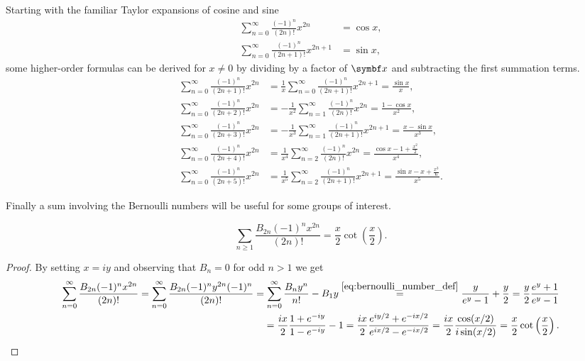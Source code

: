 Starting with the familiar Taylor expansions of cosine and sine
\begin{align}
  \label{eq:cos_sum} \sum_{n=0}^\infty \frac{(-1)^n}{(2n)!} x^{2n}     & = \cos x, \\
  \label{eq:sin_sum} \sum_{n=0}^\infty \frac{(-1)^n}{(2n+1)!} x^{2n+1} & = \sin x,
\end{align}
some higher-order formulas can be derived for $x \neq 0$ by dividing by a factor of $\x$ and subtracting the first summation terms.
\begin{align}
  \label{eq:trig_sum1}
  \sum_{n=0}^\infty \frac{(-1)^n}{(2n+1)!} x^{2n} & = \frac{1}{x} \sum_{n=0}^\infty  \frac{(-1)^n}{(2n+1)!} x^{2n+1} = \frac{\sin x}{x},                        \\
  \label{eq:trig_sum2}
  \sum_{n=0}^\infty \frac{(-1)^n}{(2n+2)!} x^{2n} & = -\frac{1}{x^2} \sum_{n=1}^\infty \frac{(-1)^n}{(2n)!} x^{2n} = \frac{1 - \cos x}{x^2},                    \\
  \label{eq:trig_sum3}
  \sum_{n=0}^\infty \frac{(-1)^n}{(2n+3)!} x^{2n} & = -\frac{1}{x^3} \sum_{n=1}^\infty \frac{(-1)^n}{(2n+1)!} x^{2n+1} = \frac{x - \sin x}{x^3},                \\
  \label{eq:trig_sum4}
  \sum_{n=0}^\infty \frac{(-1)^n}{(2n+4)!} x^{2n} & = \frac{1}{x^4} \sum_{n=2}^\infty \frac{(-1)^n}{(2n)!} x^{2n} = \frac{\cos x - 1 + \frac{x^2}{2}}{x^4},     \\
  \label{eq:trig_sum5}
  \sum_{n=0}^\infty \frac{(-1)^n}{(2n+5)!} x^{2n} & = \frac{1}{x^5} \sum_{n=2}^\infty \frac{(-1)^n}{(2n+1)!} x^{2n+1} = \frac{\sin x - x + \frac{x^3}{6}}{x^5}.
\end{align}

Finally a sum involving the Bernoulli numbers will be useful for some groups of interest.
\begin{proposition}
  \begin{equation}
    \label{eq:bernoulli_cot}
    \sum_{n \geq 1} \frac{B_{2n} (-1)^n x^{2n}}{(2n)!} = \frac{x}{2} \cot \left(\frac{x}{2}\right).
  \end{equation}
\end{proposition}
\begin{proof}
  By setting $x = iy$ and observing that $B_n = 0$ for odd $n > 1$ we get
  \begin{equation}
    \begin{aligned}
      \sum_{n=0}^\infty \frac{B_{2n} (-1)^n x^{2n}}{(2n)!} = \sum_{n=0}^\infty \frac{B_{2n} (-1)^n y^{2n} (-1)^n}{(2n)!} = \sum_{n=0}^\infty \frac{B_n y^n}{n!} - B_1 y \overset{\eqref{eq:bernoulli_number_def}} = \frac{y}{e^y - 1} + \frac{y}{2}
      = \frac{y}{2} \frac{e^y + 1 }{e^y - 1} \\
      = \frac{ix}{2} \frac{1 + e^{-iy}}{1 - e^{-iy}} - 1 = \frac{ix}{2} \frac{e^{iy / 2} + e^{-ix/2}}{e^{ix/2} - e^{-ix/2}} = \frac{ix}{2} \frac{\cos (x / 2)}{i \sin(x / 2)} = \frac{x}{2} \cot \left( \frac{x}{2} \right).
    \end{aligned}
  \end{equation}
\end{proof}



